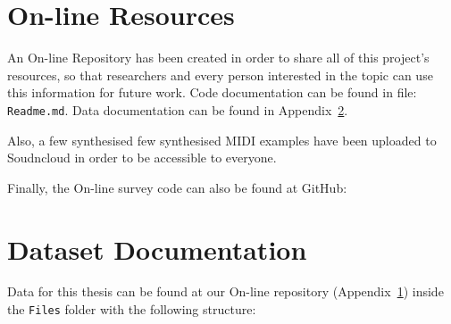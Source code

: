 \begin{appendices}
\cleardoublepage

\chapter{On-line Resources} 
\label{app:code}
An On-line Repository has been created in order to share all of this project's resources, so that researchers and every person interested in the topic can use this information for future work. Code documentation can be found in file: \texttt{Readme.md}. Data documentation can be found in Appendix~\ref{app:dataset}.

\vspace{0.5cm}

\noindent{}

\vspace{0.5cm}
Also, a few synthesised few synthesised MIDI examples have been uploaded to Soudncloud in order to be accessible to everyone. 

\vspace{0.5cm}

\noindent{}

\vspace{0.5cm}
Finally, the On-line survey code can also be found at GitHub:

\vspace{0.5cm}

\noindent{}
\vspace{0.5cm}


\cleardoublepage

\chapter{Dataset Documentation}
\label{app:dataset}
Data for this thesis can be found at our On-line repository (Appendix~\ref{app:code}) inside the \texttt{Files} folder with the following structure:

\vspace{1cm}


\end{appendices}
